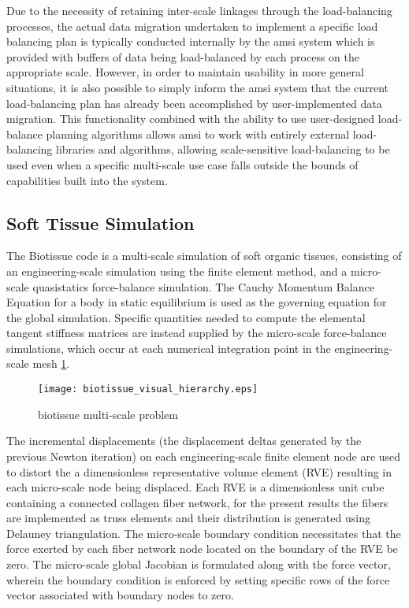 \documentclass[11pt]{siamltex1213}
\begin{document}
Due to the necessity of retaining inter-scale linkages through the load-balancing processes, the actual data migration undertaken to implement a specific load balancing plan is typically conducted internally by the amsi system which is provided with buffers of data being load-balanced by each process on the appropriate scale. However, in order to maintain usability in more general situations, it is also possible to simply inform the amsi system that the current load-balancing plan has already been accomplished by user-implemented data migration. This functionality combined with the ability to use user-designed load-balance planning algorithms allows amsi to work with entirely external load-balancing libraries and algorithms, allowing scale-sensitive load-balancing to be used even when a specific multi-scale use case falls outside the bounds of capabilities built into the system.

\subsection{Soft Tissue Simulation}\label{biotissue}
The Biotissue code is a multi-scale simulation of soft organic tissues, consisting of an engineering-scale simulation using the finite element method, and a micro-scale quasistatics force-balance simulation. The Cauchy Momentum Balance Equation for a body in static equilibrium is used as the governing equation for the global simulation. Specific quantities needed to compute the elemental tangent stiffness matrices are instead supplied by the micro-scale force-balance simulations, which occur at each numerical integration point in the engineering-scale mesh \ref{biotissue_hierarchy}. 

\begin{figure}
  \begin{center}
    \texttt{[image: biotissue\_visual\_hierarchy.eps]}
  \end{center}
  \caption{\small biotissue multi-scale problem}
  \label{biotissue_hierarchy}
\end{figure}

The incremental displacements (the displacement deltas generated by the previous Newton iteration) on each engineering-scale finite element node are used to distort the a dimensionless representative volume element (RVE) resulting in each micro-scale node being displaced. Each RVE is a dimensionless unit cube containing a connected collagen fiber network, for the present results the fibers are implemented as truss elements and their distribution is generated using Delauney triangulation. The micro-scale boundary condition necessitates that the force exerted by each fiber network node located on the boundary of the RVE be zero. The micro-scale global Jacobian is formulated along with the force vector, wherein the boundary condition is enforced by setting specific rows of the force vector associated with boundary nodes to zero. 
\end{document}
